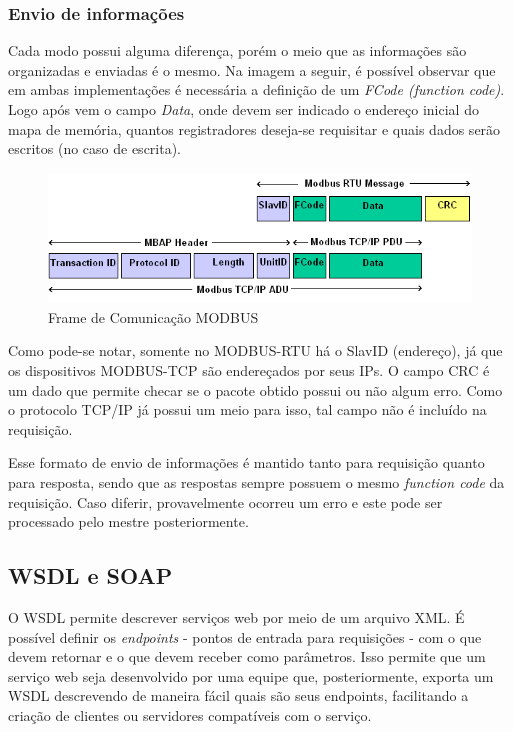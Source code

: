       \subsubsection{Envio de informações}

        Cada modo possui alguma diferença, porém o meio que as informações são organizadas e enviadas é o mesmo. Na imagem a seguir, é possível observar que em ambas implementações é necessária a definição de um \textit{FCode (function code)}. Logo após vem o campo \textit{Data}, onde devem ser indicado o endereço inicial do mapa de memória, quantos registradores deseja-se requisitar e quais dados serão escritos (no caso de escrita).

        \begin{figure}[H]
          \begin{center}
            \includegraphics[width=\textwidth,natwidth=585,natheight=180]{assets/images/modbus-frame.png}
            \caption{Frame de Comunicação MODBUS}
            \label{fig:modbus-frame}
          \end{center}
        \end{figure}

        Como pode-se notar, somente no MODBUS-RTU há o SlavID (endereço), já que os dispositivos MODBUS-TCP são endereçados por seus IPs. O campo CRC é um dado que permite checar se o pacote obtido possui ou não algum erro. Como o protocolo TCP/IP já possui um meio para isso, tal campo não é incluído na requisição.

        Esse formato de envio de informações é mantido tanto para requisição quanto para resposta, sendo que as respostas sempre possuem o mesmo \textit{function code} da requisição. Caso diferir, provavelmente ocorreu um erro e este pode ser processado pelo mestre posteriormente.

    \subsection{WSDL e SOAP}

      O WSDL \cite{w3c-spec-wsdl} permite descrever serviços web por meio de um arquivo \ac{XML}. É possível definir os \textit{endpoints} - pontos de entrada para requisições - com o que devem retornar e o que devem receber como parâmetros. Isso permite que um serviço web seja desenvolvido por uma equipe que, posteriormente, exporta um WSDL descrevendo de maneira fácil quais são seus endpoints, facilitando a criação de clientes ou servidores compatíveis com o serviço.

